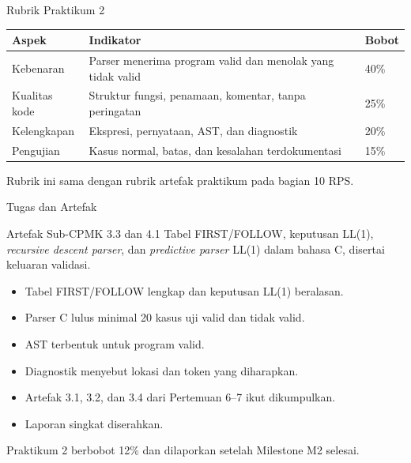 \documentclass[aspectratio=169,10pt,t]{beamer}
\begin{document}
\begin{frame}{Rubrik Praktikum 2}
  \small
  \setlength{\tabcolsep}{4pt}
  \begin{tabular}{@{}p{3.4cm}p{8.6cm}p{1.8cm}@{}}
    \toprule
    \textbf{Aspek} & \textbf{Indikator} & \textbf{Bobot} \\
    \midrule
    Kebenaran & Parser menerima program valid dan menolak yang tidak
      valid & 40\% \\
    Kualitas kode & Struktur fungsi, penamaan, komentar, tanpa
      peringatan & 25\% \\
    Kelengkapan & Ekspresi, pernyataan, AST, dan diagnostik & 20\% \\
    Pengujian & Kasus normal, batas, dan kesalahan terdokumentasi &
      15\% \\
    \bottomrule
  \end{tabular}

  \vspace{5pt}
  {\footnotesize\color{ubbblue!80}Rubrik ini sama dengan rubrik artefak
  praktikum pada bagian 10 RPS.}
\end{frame}

\begin{frame}{Tugas dan Artefak}
  \begin{block}{Artefak Sub-CPMK 3.3 dan 4.1}
    Tabel FIRST/FOLLOW, keputusan LL(1), \textit{recursive descent
    parser}, dan \textit{predictive parser} LL(1) dalam bahasa C,
    disertai keluaran validasi.
  \end{block}

  \small
  \begin{itemize}
    \item Tabel FIRST/FOLLOW lengkap dan keputusan LL(1) beralasan.
    \item Parser C lulus minimal 20 kasus uji valid dan tidak valid.
    \item AST terbentuk untuk program valid.
    \item Diagnostik menyebut lokasi dan token yang diharapkan.
    \item Artefak 3.1, 3.2, dan 3.4 dari Pertemuan 6--7 ikut
          dikumpulkan.
    \item Laporan singkat diserahkan.
  \end{itemize}

  \vspace{3pt}
  {\footnotesize\color{ubbblue!75}Praktikum 2 berbobot 12\% dan
  dilaporkan setelah Milestone M2 selesai.}
\end{frame}
\end{document}
